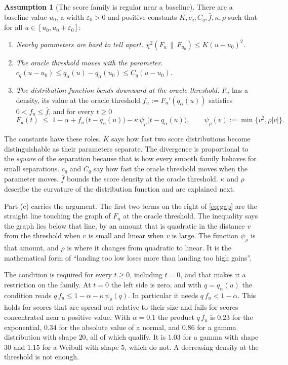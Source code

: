 \documentclass[11pt]{article}
\theoremstyle{definition}
\newtheorem{assumption}{Assumption}
\theoremstyle{remark}
\newcommand{\chis}{\chi^2}
\begin{document}
\begin{assumption}[The score family is regular near a baseline]\label{as:family}
There are a baseline value $u_0$, a width $\varepsilon_0>0$ and positive constants
$K,c_q,C_q,\bar f,\kappa,\rho$ such that for all $u\in[u_0,u_0+\varepsilon_0]$:
\begin{enumerate}
\item[(a)] \emph{Nearby parameters are hard to tell apart.}
  $\chis(F_u\,\|\,F_{u_0})\le K(u-u_0)^2$.
\item[(b)] \emph{The oracle threshold moves with the parameter.}
  $c_q(u-u_0)\le q_\alpha(u)-q_\alpha(u_0)\le C_q(u-u_0)$.
\item[(c)] \emph{The distribution function bends downward at the oracle threshold.} $F_u$
  has a density, its value at the oracle threshold $f_u:=F_u'(q_\alpha(u))$ satisfies
  $0<f_u\le\bar f$, and for every $t\ge0$
  \begin{equation}\label{eq:gap}
    F_u(t)\;\le\;1-\alpha+f_u\,\big(t-q_\alpha(u)\big)-\kappa\,\psi_\rho\big(t-q_\alpha(u)\big),
    \qquad \psi_\rho(v):=\min\{v^2,\rho|v|\}.
  \end{equation}
\end{enumerate}
\end{assumption}

The constants have these roles. $K$ says how fast two score distributions become
distinguishable as their parameters separate. The divergence is proportional to the
\emph{square} of the separation because that is how every smooth family behaves for small
separations. $c_q$ and $C_q$ say how fast the oracle threshold moves when the parameter
moves. $\bar f$ bounds the score density at the oracle threshold. $\kappa$ and $\rho$
describe the curvature of the distribution function and are explained next.

Part (c) carries the argument. The first two terms on the right
of \eqref{eq:gap} are the straight line touching the graph of $F_u$ at the oracle threshold.
The inequality says the graph lies below that line, by an amount that is quadratic in the
distance $v$ from the threshold when $v$ is small and linear when $v$ is large. The function
$\psi_\rho$ is that amount, and $\rho$ is where it changes from quadratic to linear. It is
the mathematical form of ``landing too low loses more than landing too high gains''.

The condition is required for every $t\ge0$, including $t=0$, and that makes it a
restriction on the family. At $t=0$ the left side is zero, and with $q=q_\alpha(u)$ the
condition reads $q\,f_u\le1-\alpha-\kappa\,\psi_\rho(q)$. In particular it needs
$q\,f_u<1-\alpha$. This holds for scores that are spread out relative to their size and
fails for scores concentrated near a positive value. With $\alpha=0.1$ the product $q\,f_u$
is $0.23$ for the exponential, $0.34$ for the absolute value of a normal, and $0.86$ for a
gamma distribution with shape $20$, all of which qualify. It is $1.03$ for a gamma with
shape $30$ and $1.15$ for a Weibull with shape $5$, which do not. A decreasing density at the
threshold is not enough.
\end{document}
